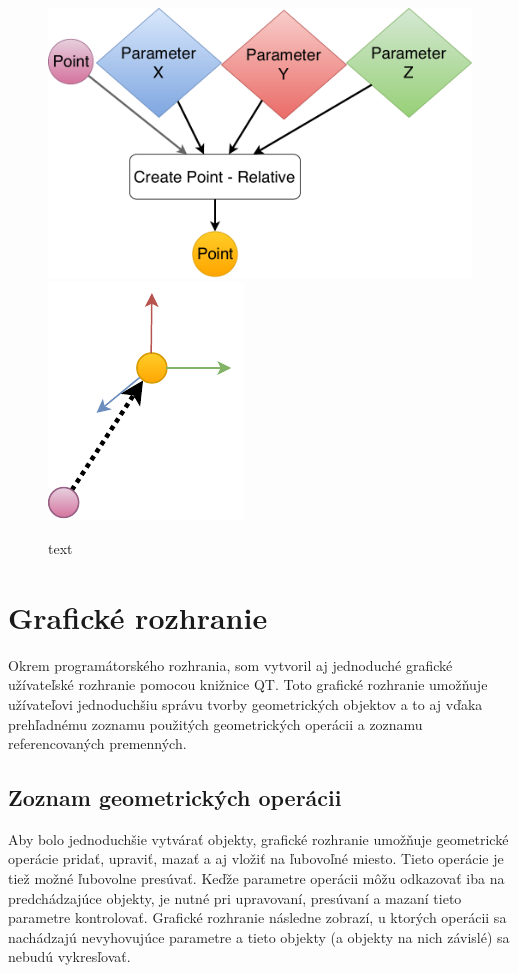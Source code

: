 \begin{figure}[H]
	\centering
	\includegraphics[height=0.3\textwidth]{obrazky-figures/Diagram/DP Navrh operacii-0D - Point2.pdf}
	\includegraphics[height=0.3\textwidth]{obrazky-figures/Diagram/Draw/1Points/DP Navrh operacii-0D - PointRelative.pdf}
	\caption{text}
	\label{fig:1}
\end{figure}




\chapter{Grafické rozhranie}
Okrem programátorského rozhrania, som vytvoril aj jednoduché grafické užívateľské rozhranie pomocou knižnice QT. Toto grafické rozhranie umožňuje užívateľovi jednoduchšiu správu tvorby geometrických objektov a to aj vďaka prehľadnému zoznamu použitých geometrických operácii a zoznamu referencovaných premenných. 

\section{Zoznam geometrických operácii}
Aby bolo jednoduchšie vytvárať objekty, grafické rozhranie umožňuje geometrické operácie pridať, upraviť, mazať a aj vložiť na ľubovoľné miesto. Tieto operácie je tiež možné ľubovolne presúvať. Keďže parametre operácii môžu odkazovať iba na predchádzajúce objekty, je nutné pri upravovaní, presúvaní a mazaní tieto parametre kontrolovať. Grafické rozhranie následne zobrazí, u ktorých operácii sa nachádzajú nevyhovujúce parametre a tieto objekty (a objekty na nich závislé) sa nebudú vykresľovať.



